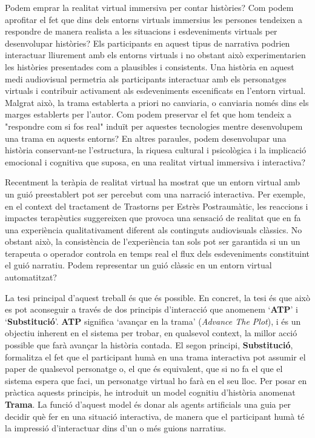 \documentclass[11pt,a4paper,pdftex,headexclude,smallheadings,pointlessnumbers,bibtotoc,idxtotoc,twoside,authordate1-4]{report}
\begin{document}
Podem emprar la realitat virtual immersiva per contar històries? Com podem aprofitar el fet que dins dels entorns virtuals immersius les persones tendeixen a respondre de manera realista a les situacions i esdeveniments virtuals per desenvolupar històries? Els participants en aquest tipus de narrativa podrien interactuar lliurement  amb els entorns virtuals i no obstant això experimentarien les històries presentades com a plausibles i consistents. Una història en aquest medi audiovisual permetria als participants interactuar amb els personatges virtuals i contribuir activament als esdeveniments escenificats en l'entorn virtual. Malgrat això, la trama establerta a priori no canviaria, o canviaria només dins els marges establerts per l'autor. Com podem preservar el fet que hom tendeix a "respondre com si fos real" induït per aquestes tecnologies mentre desenvolupem una trama en aquests entorns? En altres paraules, podem desenvolupar una història conservant-ne l'estructura, la riquesa cultural i psicològica i la implicació emocional i cognitiva que suposa, en una realitat virtual immersiva i interactiva?

Recentment la teràpia de realitat virtual ha mostrat que un entorn virtual  amb un guió preestablert pot ser percebut com una narració interactiva. Per exemple, en el context del tractament de Trastorns per Estrès Postraumàtic, les reaccions i impactes terapèutics suggereixen que provoca una sensació de realitat que en fa una experiència qualitativament diferent als continguts audiovisuals clàssics. No obstant això, la consistència de l'experiència tan sols pot ser garantida si un un terapeuta o operador controla en temps real el flux dels esdeveniments constituint el guió narratiu. Podem representar un guió clàssic en un entorn virtual automatitzat?

La tesi principal d'aquest treball és que és possible. En concret, la tesi és que això es pot aconseguir a través de dos principis d'interacció que anomenem `\textbf {ATP}' i `\textbf {Substitució}'. \textbf {ATP} significa `avançar en la trama' (\emph{Advance The Plot}), i és un objectiu inherent  en el sistema per trobar, en qualsevol context, la millor acció possible que farà avançar la història contada. El segon principi, \textbf {Substitució}, formalitza el fet que el participant humà en una trama interactiva pot assumir el paper de qualsevol personatge o, el que és equivalent, que si no fa el que el sistema espera que faci, un personatge virtual ho farà en el seu lloc. Per posar en pràctica aquests principis, he introduit un model cognitiu d'història anomenat \textbf {Trama}. La funció d'aquest model és donar als agents artificials una guia per decidir què fer en una situació interactiva, de manera que el participant humà té la impressió d'interactuar dins d'un o més guions narratius.
\end{document}
